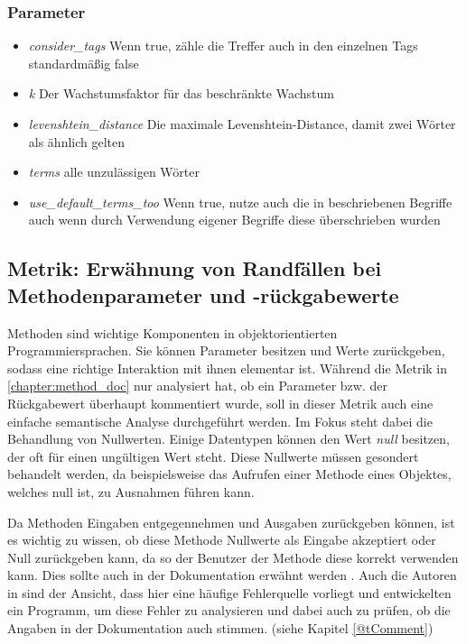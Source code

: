  \subsubsection{Parameter}
\begin{itemize}
    \item \textit{consider\_tags} Wenn true, zähle die Treffer auch in den einzelnen Tags standardmäßig false
    \item \textit{k} Der Wachstumsfaktor für das beschränkte Wachstum
    \item \textit{levenshtein\_distance} Die maximale Levenshtein-Distance, damit zwei Wörter als ähnlich gelten
    \item \textit{terms} alle unzulässigen Wörter
    \item \textit{use\_default\_terms\_too} Wenn true, nutze auch die in \cite{HowtoWriteDocCommentsfortheJavadocTool} beschriebenen Begriffe auch wenn durch Verwendung eigener Begriffe diese überschrieben wurden
\end{itemize}
 \subsection{Metrik: Erwähnung von Randfällen bei Methodenparameter und -rückgabewerte}\label{chapter:metric_edge_case}
 Methoden sind wichtige Komponenten in objektorientierten Programmiersprachen. Sie können Parameter besitzen und Werte zurückgeben, sodass eine richtige Interaktion mit ihnen elementar ist. Während die Metrik in \ref{chapter:method_doc} nur analysiert hat, ob ein Parameter bzw. der Rückgabewert überhaupt kommentiert wurde, soll in dieser Metrik auch eine einfache semantische Analyse durchgeführt werden. Im Fokus steht dabei die Behandlung von Nullwerten. Einige Datentypen können den Wert \textit{null} besitzen, der oft für einen ungültigen Wert steht. Diese Nullwerte müssen gesondert behandelt werden, da beispielsweise das Aufrufen einer Methode eines Objektes, welches null ist, zu Ausnahmen führen kann.
 
 Da Methoden Eingaben entgegennehmen und Ausgaben zurückgeben können, ist es wichtig zu wissen, ob diese Methode Nullwerte als Eingabe akzeptiert oder Null zurückgeben kann, da so der Benutzer der Methode diese korrekt verwenden kann. Dies sollte auch in der Dokumentation erwähnt werden \cite{javadoc_coding_standards}. Auch die Autoren in \cite[S. 260 ff.]{@tComment:TestingJavadocCommentstoDetectComment-CodeInconsistencies} sind der Ansicht, dass hier eine häufige Fehlerquelle vorliegt und entwickelten ein Programm, um diese Fehler zu analysieren und dabei auch zu prüfen, ob die Angaben in der Dokumentation auch stimmen. (siehe Kapitel \ref{@tComment})
 
